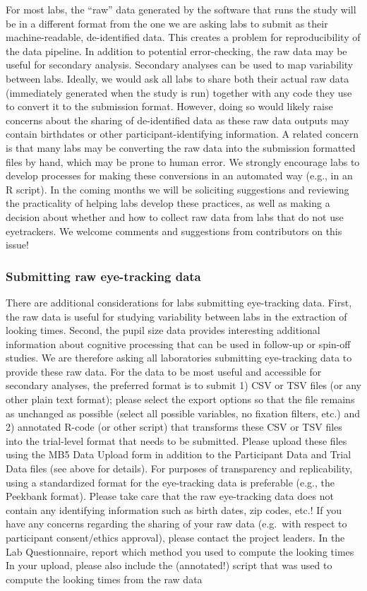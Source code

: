 \documentclass[
  letterpaper,
  DIV=11,
  numbers=noendperiod,
  oneside]{scrreprt}
\begin{document}
For most labs, the ``raw'' data generated by the software that runs the
study will be in a different format from the one we are asking labs to
submit as their machine-readable, de-identified data. This creates a
problem for reproducibility of the data pipeline. In addition to
potential error-checking, the raw data may be useful for secondary
analysis. Secondary analyses can be used to map variability between
labs. Ideally, we would ask all labs to share both their actual raw data
(immediately generated when the study is run) together with any code
they use to convert it to the submission format. However, doing so would
likely raise concerns about the sharing of de-identified data as these
raw data outputs may contain birthdates or other participant-identifying
information. A related concern is that many labs may be converting the
raw data into the submission formatted files by hand, which may be prone
to human error. We strongly encourage labs to develop processes for
making these conversions in an automated way (e.g., in an R script). In
the coming months we will be soliciting suggestions and reviewing the
practicality of helping labs develop these practices, as well as making
a decision about whether and how to collect raw data from labs that do
not use eyetrackers. We welcome comments and suggestions from
contributors on this issue!

\subsubsection{Submitting raw eye-tracking
data}\label{submitting-raw-eye-tracking-data}

There are additional considerations for labs submitting eye-tracking
data. First, the raw data is useful for studying variability between
labs in the extraction of looking times. Second, the pupil size data
provides interesting additional information about cognitive processing
that can be used in follow-up or spin-off studies. We are therefore
asking all laboratories submitting eye-tracking data to provide these
raw data. For the data to be most useful and accessible for secondary
analyses, the preferred format is to submit 1) CSV or TSV files (or any
other plain text format); please select the export options so that the
file remains as unchanged as possible (select all possible variables, no
fixation filters, etc.) and 2) annotated R-code (or other script) that
transforms these CSV or TSV files into the trial-level format that needs
to be submitted. Please upload these files using the MB5 Data Upload
form in addition to the Participant Data and Trial Data files (see above
for details). For purposes of transparency and replicability, using a
standardized format for the eye-tracking data is preferable (e.g., the
Peekbank format). Please take care that the raw eye-tracking data does
not contain any identifying information such as birth dates, zip codes,
etc.! If you have any concerns regarding the sharing of your raw data
(e.g.~with respect to participant consent/ethics approval), please
contact the project leaders. In the Lab Questionnaire, report which
method you used to compute the looking times In your upload, please also
include the (annotated!) script that was used to compute the looking
times from the raw data
\end{document}
